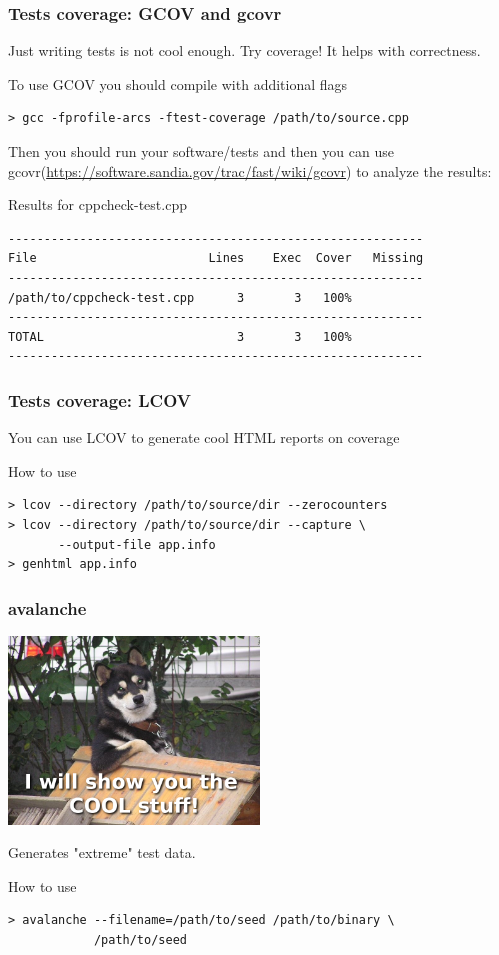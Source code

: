 \documentclass{beamer}
\begin{document}
\begin{frame}[fragile]
\frametitle{Tests coverage: GCOV and gcovr}
Just writing tests is not cool enough. Try coverage! It helps with correctness.
\begin{exampleblock}{To use GCOV you should compile with additional flags}
\begin{Verbatim}[fontsize=\small]
> gcc -fprofile-arcs -ftest-coverage /path/to/source.cpp
\end{Verbatim}
\end{exampleblock}
Then you should run your software/tests and then you can use gcovr(\url{https://software.sandia.gov/trac/fast/wiki/gcovr}) to analyze the results:
\begin{exampleblock}{Results for cppcheck-test.cpp}
\begin{Verbatim}[fontsize=\small]
----------------------------------------------------------
File                        Lines    Exec  Cover   Missing
----------------------------------------------------------
/path/to/cppcheck-test.cpp      3       3   100%   
----------------------------------------------------------
TOTAL                           3       3   100%
----------------------------------------------------------
\end{Verbatim}
\end{exampleblock}
\end{frame}

\begin{frame}[fragile]
\frametitle{Tests coverage: LCOV}
You can use LCOV to generate cool HTML reports on coverage
\begin{exampleblock}{How to use}
\begin{verbatim}
> lcov --directory /path/to/source/dir --zerocounters
> lcov --directory /path/to/source/dir --capture \
       --output-file app.info
> genhtml app.info
\end{verbatim}
\end{exampleblock}
\end{frame}

\begin{frame}[fragile]
\frametitle{avalanche}
\begin{center}
\includegraphics[width=0.5\textwidth]{img/cool-dog}
\end{center}
Generates "extreme" test data. 
\begin{exampleblock}{How to use}
\begin{verbatim}
> avalanche --filename=/path/to/seed /path/to/binary \
            /path/to/seed
\end{verbatim}
\end{exampleblock}
\end{frame}
\end{document}
